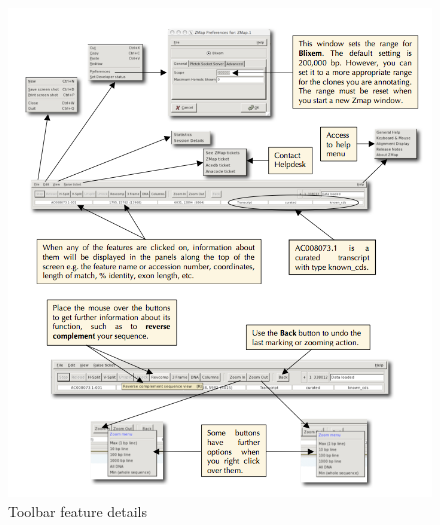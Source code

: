 \documentclass[letterpaper]{article}
\begin{document}
\begin{figure}
\centering
\color[rgb]{0.30980393,0.5058824,0.7411765}
\includegraphics[width=15.231cm]{images/toolbar_feature_details.png}
\caption{Toolbar feature details}
\label{img_toolbar_feature_details}
\end{figure}
\end{document}
